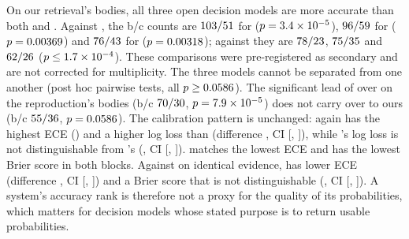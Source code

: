 On our retrieval's bodies, all three open decision models are more accurate than both \orb{} and \jev{}. Against
\orb, the b/c counts are $103/51$ for \flash{} ($p=3.4\times10^{-5}$),
$96/59$ for \clef{} ($p=0.00369$) and $76/43$ for
\pplx{} ($p=0.00318$); against \jev{} they are $78/23$, $75/35$
and $62/26$ ($p\le1.7\times10^{-4}$). These comparisons were pre-registered as secondary and are
not corrected for multiplicity. The three models cannot be separated from one another (post hoc pairwise tests, all
$p\ge0.0586$).
The significant lead of \flash{} over \pplx{} on the reproduction's bodies (b/c $70/30$,
$p=7.9\times10^{-5}$) does not carry over to ours (b/c $55/36$, $p=0.0586$).
The calibration pattern is unchanged: \flash{} again has the highest ECE (\fsFlashBEce) and a higher log loss than
\orb{} (difference \fsLlCleanMinusFlashB, CI [\fsLlCleanMinusFlashBLo, \fsLlCleanMinusFlashBHi]), while \clef's log
loss is not distinguishable from \orb's (\fsLlCleanMinusClefB, CI [\fsLlCleanMinusClefBLo, \fsLlCleanMinusClefBHi]).
\pplx{} matches the lowest ECE and has the lowest Brier score in both blocks. Against \jev{} on identical evidence,
\orb{} has lower ECE (difference \fsSwapDiffEce, CI [\fsSwapDiffEceLo, \fsSwapDiffEceHi]) and a Brier score that is
not distinguishable (\fsSwapDiffBrier, CI [\fsSwapDiffBrierLo, \fsSwapDiffBrierHi]). A system's accuracy rank is
therefore not a proxy for the quality of its probabilities, which matters for decision models whose stated purpose
is to return usable probabilities.
